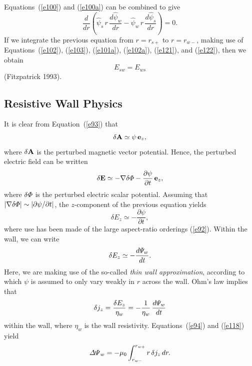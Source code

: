 \documentclass[notitlepage,12pt]{article}
\begin{document}
Equations~(\ref{e100}) and (\ref{e100a}) can be combined to give
\begin{equation}
\frac{d}{dr}\!\left(\hat{\psi}_s\,r\,\frac{d\hat{\psi}_w}{dr} - \hat{\psi}_w\,r\,\frac{d\hat{\psi}_s}{dr}\right) = 0.
\end{equation}
If we integrate the previous equation from $r=r_{s+}$ to $r=r_{w-}$, making use of Equations~(\ref{e102}), (\ref{e103}), (\ref{e101a}), (\ref{e102a}), (\ref{e121}),
and (\ref{e122}), then we obtain
\begin{equation}\label{e123}
E_{sw} = E_{ws}
\end{equation}
(Fitzpatrick 1993). 

\subsection{Resistive Wall Physics}
It is clear from Equation~(\ref{e93}) that
\begin{equation}
\delta {\bf A} \simeq \psi\,{\bf e}_z,
\end{equation}
where $\delta {\bf A}$ is the perturbed magnetic vector potential. 
Hence, the perturbed electric field can be written
\begin{equation}
\delta {\bf E} \simeq -\nabla\delta{\mit\Phi} - \frac{\partial\psi}{\partial t}\,{\bf e}_z,
\end{equation}
where $\delta{\mit\Phi}$ is the perturbed electric scalar potential. 
Assuming that $|\nabla\delta{\mit\Phi}|\sim |\partial\psi/\partial t|$, the $z$-component of the previous
equation yields
\begin{equation}
\delta E_z\simeq -\frac{\partial\psi}{\partial t},
\end{equation}
where use has been made of the large aspect-ratio orderings (\ref{e92}). Within the wall, we
can write
\begin{equation}
\delta E_z \simeq -\frac{d{\mit\Psi}_w}{dt}.
\end{equation}
Here, we are making use of the so-called {\em thin wall approximation}, according to which $\psi$ is assumed to only vary weakly in $r$ across 
the wall. Ohm's law implies that
\begin{equation}
\delta j_z = \frac{\delta E_z}{\eta_w} = -\frac{1}{\eta_w}\,\frac{d{\mit\Psi}_w}{dt}
\end{equation}
within the wall, where $\eta_w$ is the wall resistivity. Equations~(\ref{e94}) and (\ref{e118}) yield
\begin{equation}\label{e132}
{\mit\Delta\Psi}_w = -\mu_0\int_{r_{w-}}^{r_{w+}}r\,\delta j_z\,dr.
\end{equation}
\end{document}
